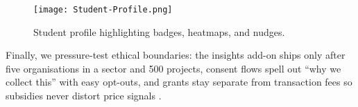 \begin{figure}[H]
  \centering
  \texttt{[image: Student-Profile.png]}
  \caption{Student profile highlighting badges, heatmaps, and nudges.}
  \label{fig:student-profile}
\end{figure}

Finally, we pressure-test ethical boundaries: the insights add-on ships only after five organisations in a sector and 500 projects, consent flows spell out ``why we collect this'' with easy opt-outs, and grants stay separate from transaction fees so subsidies never distort price signals \citep{Zuboff2019,Srnicek2017}.
